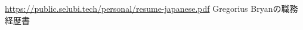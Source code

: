 \documentclass[11pt, a4paper]{selu-cv}
\begin{document}
\makecvheader[C]

\makecvfooter
  {\url{https://public.selubi.tech/personal/resume-japanese.pdf}}
  {}
  {Gregorius Bryanの職務経歴書}












\end{document}
